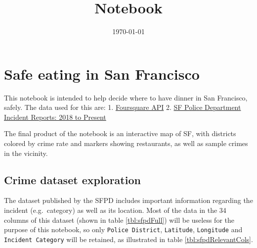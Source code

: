 \documentclass[10pt,parskip=half,
toc=sectionentrywithdots,
bibliography=totocnumbered,
captions=tableheading,numbers=noendperiod]{scrartcl}
\begin{document}
    \title{Notebook}
  \date{\today}
  \maketitle

    \begingroup
    \let\cleardoublepage\relax
    \let\clearpage\relax\tableofcontents
    \endgroup

\hypertarget{safe-eating-in-san-francisco}{%
\section{Safe eating in San
Francisco}\label{safe-eating-in-san-francisco}}

This notebook is intended to help decide where to have dinner in San
Francisco, safely. The data used for this are: 1.
\href{https://developer.foursquare.com/docs/api/venues/explore}{Foursquare
API} 2.
\href{https://data.sfgov.org/Public-Safety/Police-Department-Incident-Reports-2018-to-Present/wg3w-h783}{SF
Police Department Incident Reports: 2018 to Present}

The final product of the notebook is an interactive map of SF, with
districts colored by crime rate and markers showing restaurants, as well
as sample crimes in the vicinity.

\hypertarget{crime-dataset-exploration}{%
\subsection{Crime dataset exploration}\label{crime-dataset-exploration}}

The dataset published by the SFPD includes important information
regarding the incident (e.g.~category) as well as its location. Most of
the data in the 34 columns of this dataset (shown in table
\ref{tbl:sfpdFull}) will be useless for the purpose of this notebook, so
only \texttt{Police\ District}, \texttt{Latitude}, \texttt{Longitude}
and \texttt{Incident\ Category} will be retained, as illustrated in
table \ref{tbl:sfpdRelevantCols}.
\end{document}
